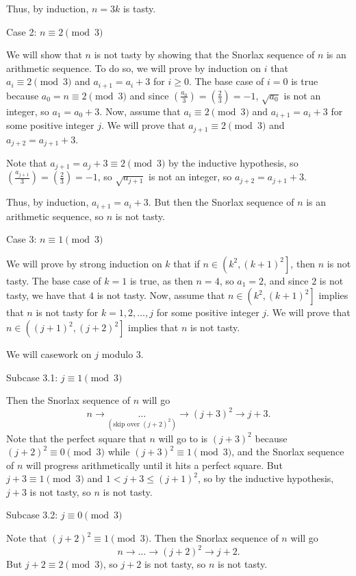 Thus, by induction, $n=3k$ is tasty.

Case 2: $n\equiv2\pmod3$

We will show that $n$ is not tasty by showing that the Snorlax sequence of $n$ is an arithmetic sequence. To do so, we will prove by induction on $i$ that $a_i\equiv2\pmod3$ and $a_{i+1}=a_i+3$ for $i\geq0$. The base case of $i=0$ is true because $a_0=n\equiv2\pmod3$ and since $\left(\frac{a_0}{3}\right)=\left(\frac{2}{3}\right)=-1$, $\sqrt{a_0}$ is not an integer, so $a_1=a_0+3$. Now, assume that $a_i\equiv2\pmod3$ and $a_{i+1}=a_i+3$ for some positive integer $j$. We will prove that $a_{j+1}\equiv2\pmod3$ and $a_{j+2}=a_{j+1}+3$.

Note that $a_{j+1}=a_j+3\equiv2\pmod3$ by the inductive hypothesis, so $\left(\frac{a_{j+1}}{3}\right)=\left(\frac{2}{3}\right)=-1$, so $\sqrt{a_{j+1}}$ is not an integer, so $a_{j+2}=a_{j+1}+3$.

Thus, by induction, $a_{i+1}=a_i+3$. But then the Snorlax sequence of $n$ is an arithmetic sequence, so $n$ is not tasty.

Case 3: $n\equiv1\pmod3$

We will prove by strong induction on $k$ that if $n\in\left(k^2,\left(k+1\right)^2\right]$, then $n$ is not tasty. The base case of $k=1$ is true, as then $n=4$, so $a_1=2$, and since $2$ is not tasty, we have that $4$ is not tasty. Now, assume that $n\in\left(k^2,\left(k+1\right)^2\right]$ implies that $n$ is not tasty for $k=1,2,\ldots,j$ for some positive integer $j$. We will prove that $n\in\left(\left(j+1\right)^2,\left(j+2\right)^2\right]$ implies that $n$ is not tasty.

We will casework on $j$ modulo $3$.

Subcase 3.1: $j\equiv1\pmod3$

Then the Snorlax sequence of $n$ will go \[n\rightarrow\underset{\left(\text{skip over }\left(j+2\right)^2\right)}{\ldots}\rightarrow\left(j+3\right)^2\rightarrow j+3.\] Note that the perfect square that $n$ will go to is $\left(j+3\right)^2$ because $\left(j+2\right)^2\equiv0\pmod3$ while $\left(j+3\right)^2\equiv1\pmod3$, and the Snorlax sequence of $n$ will progress arithmetically until it hits a perfect square. But $j+3\equiv1\pmod3$ and $1<j+3\leq\left(j+1\right)^2$, so by the inductive hypothesis, $j+3$ is not tasty, so $n$ is not tasty.

Subcase 3.2: $j\equiv0\pmod3$

Note that $\left(j+2\right)^2\equiv1\pmod3$. Then the Snorlax sequence of $n$ will go \[n\rightarrow\ldots\rightarrow\left(j+2\right)^2\rightarrow j+2.\] But $j+2\equiv2\pmod3$, so $j+2$ is not tasty, so $n$ is not tasty.

